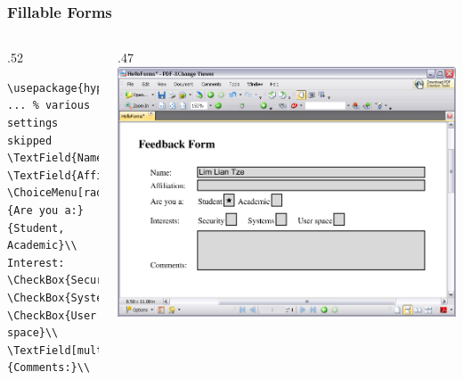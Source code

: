 \begin{frame}
\frametitle{Fillable  Forms}
\begin{columns}
\begin{column}{.52\textwidth}
\begin{beamerboxesrounded}{}
\begin{lstlisting}[basicstyle=\ttfamily\small,escapechar=|,
moretexcs={TextField,ChoiceMenu,CheckBox},
emph={hyperref}]
\usepackage{hyperref}
... % various settings skipped
\TextField{Name:}\\
\TextField{Affiliation:}\\
\ChoiceMenu[radio=true]
{Are you a:}{Student, Academic}\\
Interest:
\CheckBox{Security}
\CheckBox{Systems}
\CheckBox{User space}\\
\TextField[multiline=true]
{Comments:}\\
\end{lstlisting}
\end{beamerboxesrounded}
\end{column}
\begin{column}{.47\textwidth}
\centering\includegraphics[width=\linewidth]{examples/form-screencap}\par
\end{column}
\end{columns}
\pagebreak


\end{frame}
